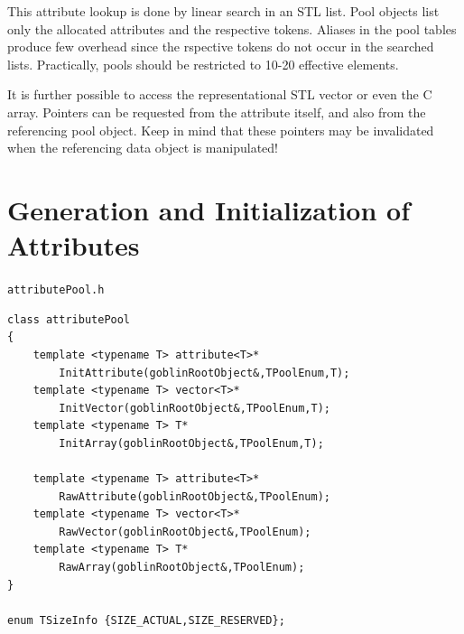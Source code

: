 \documentclass[a4paper,11pt,twoside]{book}
\begin{document}
\begin{multicols}{2}
This attribute lookup is done by linear search in an STL list. Pool objects list
only the allocated attributes and the respective tokens. Aliases in the pool
tables produce few overhead since the rspective tokens do not occur in the searched
lists. Practically, pools should be restricted to 10-20 effective elements.

It is further possible to access the representational STL vector or even the C
array. Pointers can be requested from the attribute itself, and also from the
referencing pool object. Keep in mind that these pointers may be invalidated when the
referencing data object is manipulated!


\section{Generation and Initialization of Attributes}
\myinclude\verb/attributePool.h/
\begin{mymethods}
\begin{verbatim}
class attributePool
{
    template <typename T> attribute<T>*
        InitAttribute(goblinRootObject&,TPoolEnum,T);
    template <typename T> vector<T>*
        InitVector(goblinRootObject&,TPoolEnum,T);
    template <typename T> T*
        InitArray(goblinRootObject&,TPoolEnum,T);

    template <typename T> attribute<T>*
        RawAttribute(goblinRootObject&,TPoolEnum);
    template <typename T> vector<T>*
        RawVector(goblinRootObject&,TPoolEnum);
    template <typename T> T*
        RawArray(goblinRootObject&,TPoolEnum);
}

enum TSizeInfo {SIZE_ACTUAL,SIZE_RESERVED};


\end{verbatim}
\end{mymethods}
\end{multicols}
\end{document}
